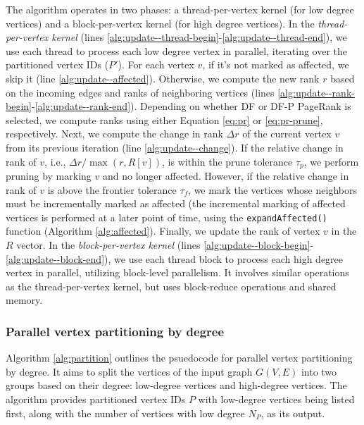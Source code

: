The algorithm operates in two phases: a thread-per-vertex kernel (for low degree vertices) and a block-per-vertex kernel (for high degree vertices). In the \textit{thread-per-vertex kernel} (lines \ref{alg:update--thread-begin}-\ref{alg:update--thread-end}), we use each thread to process each low degree vertex in parallel, iterating over the partitioned vertex IDs ($P'$). For each vertex $v$, if it's not marked as affected, we skip it (line \ref{alg:update--affected}). Otherwise, we compute the new rank $r$ based on the incoming edges and ranks of neighboring vertices (lines \ref{alg:update--rank-begin}-\ref{alg:update--rank-end}). Depending on whether DF or DF-P PageRank is selected, we compute ranks using either Equation \ref{eq:pr} or \ref{eq:pr-prune}, respectively. Next, we compute the change in rank $\Delta r$ of the current vertex $v$ from its previous iteration (line \ref{alg:update--change}). If the relative change in rank of $v$, i.e., $\Delta r / \max(r, R[v])$, is within the prune tolerance $\tau_p$, we perform pruning by marking $v$ and no longer affected. However, if the relative change in rank of $v$ is above the frontier tolerance $\tau_f$, we mark the vertices whose neighbors must be incrementally marked as affected (the incremental marking of affected vertices is performed at a later point of time, using the \texttt{expandAffected()} function (Algorithm \ref{alg:affected}). Finally, we update the rank of vertex $v$ in the $R$ vector. In the \textit{block-per-vertex kernel} (lines \ref{alg:update--block-begin}-\ref{alg:update--block-end}), we use each thread block to process each high degree vertex in parallel, utilizing block-level parallelism. It involves similar operations as the thread-per-vertex kernel, but uses block-reduce operations and shared memory.


\subsubsection{Parallel vertex partitioning by degree}

Algorithm \ref{alg:partition} outlines the psuedocode for parallel vertex partitioning by degree. It aims to split the vertices of the input graph $G(V, E)$ into two groups based on their degree: low-degree vertices and high-degree vertices. The algorithm provides partitioned vertex IDs $P$ with low-degree vertices being listed first, along with the number of vertices with low degree $N_P$, as its output.

